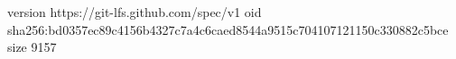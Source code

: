 version https://git-lfs.github.com/spec/v1
oid sha256:bd0357ec89c4156b4327c7a4c6caed8544a9515c704107121150c330882c5bce
size 9157
